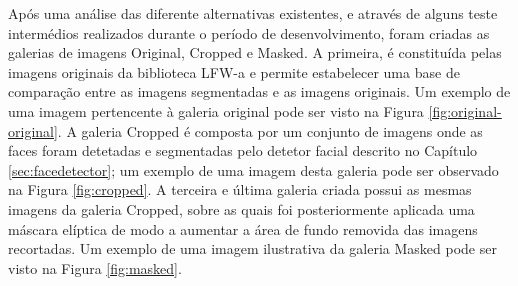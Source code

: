 Após uma análise das diferente alternativas existentes, e através de alguns teste intermédios realizados durante o período de desenvolvimento, foram criadas as galerias de imagens Original, Cropped e Masked. A primeira, é constituída pelas imagens originais da biblioteca LFW-a e permite estabelecer uma base de comparação entre as imagens segmentadas e as imagens originais. Um exemplo de uma imagem pertencente à galeria original pode ser visto na Figura \ref{fig:original-original}. A galeria Cropped é composta por um conjunto de imagens onde as faces foram detetadas e segmentadas pelo detetor facial descrito no Capítulo \ref{sec:facedetector}; um exemplo de uma imagem desta galeria pode ser observado na Figura \ref{fig:cropped}.  A terceira e última galeria criada possui as mesmas imagens da galeria Cropped, sobre as quais foi posteriormente aplicada uma máscara elíptica de modo a aumentar a área de fundo removida das imagens recortadas. Um exemplo de uma imagem ilustrativa da galeria Masked pode ser visto na Figura \ref{fig:masked}.

